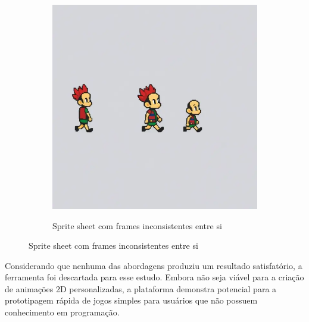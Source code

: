 \begin{figure}[htbp]
\begin{subfigure}{0.45\textwidth}
    \end{subfigure}\hfill
    \begin{subfigure}{0.45\textwidth}
    \caption{\small Sprite sheet com frames inconsistentes entre si}
    \includegraphics[width=1\linewidth]{figs/rosebud/rosebud_resultado_tela8.PNG}
    \label{fig:rosebudSpriteSheetInconsistente}
    \end{subfigure}\hfill
\end{figure}


Considerando que nenhuma das abordagens produziu um resultado satisfatório, a ferramenta foi descartada para esse estudo. Embora não seja viável para a criação de animações 2D personalizadas, a plataforma  demonstra potencial para a prototipagem rápida de jogos simples para usuários que não possuem conhecimento em programação.
